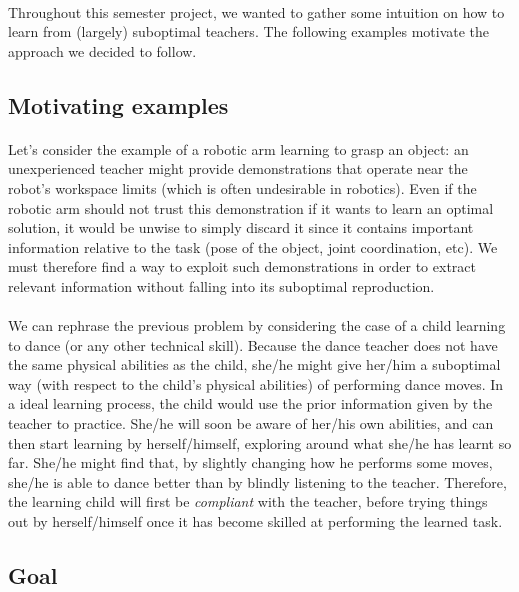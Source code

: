 \documentclass[a4paper]{report}
\begin{document}
{{			\paragraph{} Throughout this semester project, we wanted to gather some intuition on how to learn from (largely) suboptimal teachers. The following examples motivate the approach we decided to follow. 
			
			\subsection{Motivating examples}
			\paragraph{} Let's consider the example of a robotic arm learning to grasp an object: an unexperienced teacher might provide demonstrations that operate near the robot's workspace limits (which is often undesirable in robotics). Even if the robotic arm should not trust this demonstration if it wants to learn an optimal solution, it would be unwise to simply discard it since it contains important information relative to the task (pose of the object, joint coordination, etc). We must therefore find a way to exploit such demonstrations in order to extract relevant information without falling into its suboptimal reproduction. 
			
			\paragraph{}We can rephrase the previous problem by considering the case of a child learning to dance (or any other technical skill). Because the dance teacher does not have the same physical abilities as the child, she/he might give her/him a suboptimal way (with respect to the child's physical abilities) of performing dance moves. In a ideal learning process, the child would use the prior information given by the teacher to practice. She/he will soon be aware of her/his own abilities, and can then start learning by herself/himself, exploring around what she/he has learnt so far. She/he might find that, by slightly changing how he performs some moves, she/he is able to dance better than by blindly listening to the teacher. Therefore, the learning child will first be \emph{compliant} with the teacher, before trying things out by herself/himself once it has become skilled at performing the learned task. 
			
			\subsection{Goal}
}}
\end{document}
